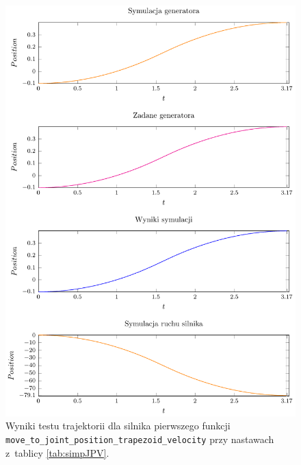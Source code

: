 \documentclass[a4paper, 12pt]{article}
\begin{document}
	\begin{figure}[H]
		\centering
		\includegraphics[scale=1.2]{raport_graphs/simpJPV.pdf}
		\caption{Wyniki testu trajektorii dla silnika pierwszego funkcji \texttt{move\_to\_joint\_position\_trapezoid\_velocity} przy nastawach z~tablicy \ref{tab:simpJPV}.}
		\label{fig:simpJPV}
	\end{figure}
\end{document}
